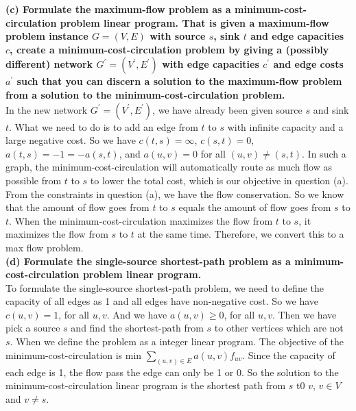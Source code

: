 \documentclass{article}
\begin{document}
\newline
\textbf{(c) Formulate the maximum-flow problem as a minimum-cost-circulation problem linear program. That is given a maximum-flow problem instance $G = (V, E)$ with source $s$, sink $t$ and edge capacities $c$, create a minimum-cost-circulation problem by giving a (possibly different) network $G^{'} = (V^{'}, E^{'})$ with edge capacities $c^{'}$ and edge costs $a^{'}$ such that you can discern a solution to the maximum-flow problem from a solution to the minimum-cost-circulation problem.}\\ \newline
In the new network $G^{'} = (V^{'}, E^{'})$, we have already been given source $s$ and sink $t$. What we need to do is to add an edge from $t$ to $s$ with infinite capacity and a large negative cost. So we have $c(t, s) = \infty$, $c(s, t) = 0$,  $a(t, s) = -1 = -a(s, t)$, and $a(u, v) = 0$ for all $(u, v) \neq (s, t)$. In such a graph, the minimum-cost-circulation will automatically route as much flow as possible from $t$ to $s$ to lower the total cost, which is our objective in question (a). From the constraints in question (a), we have the flow conservation. So we know that the amount of flow goes from $t$ to $s$ equals the amount of flow goes from $s$ to $t$. When the minimum-cost-circulation maximizes the flow from $t$ to $s$, it maximizes the flow from $s$ to $t$ at the same time. Therefore, we convert this to a max flow problem. \\ \newline
\textbf{(d) Formulate the single-source shortest-path problem as a minimum-cost-circulation problem linear program.} \\ \newline
To formulate the single-source shortest-path problem, we need to define the capacity of all edges as 1 and all edges have non-negative cost. So we have $c(u, v) = 1$, for all $u, v$. And we have $a(u, v) \geq 0$, for all $u, v$. Then we have pick a source $s$ and find the shortest-path from $s$ to other vertices which are not $s$. When we define the problem as a integer linear program. The objective of the minimum-cost-circulation is $\text{min }\sum_{(u, v) \in E} a(u, v)f_{uv}$. Since the capacity of each edge is 1, the flow pass the edge can only be 1 or 0. So the solution to the minimum-cost-circulation linear program is the shortest path from $s$ t0 $v$, $v \in V$ and $v \neq s$.
\end{document}
